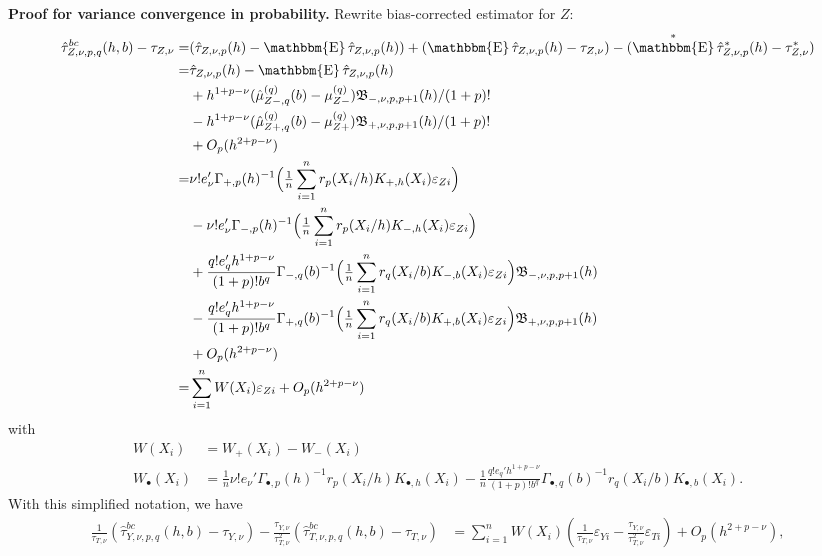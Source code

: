 \documentclass[12pt,]{article}
\DeclareMathOperator{\1}{\mathbbm{1}}
\DeclareMathOperator{\E}{\mathbbm{E}}
\newcommand{\Bf}{\mathfrak{B}}
\begin{document}
\textbf{Proof for variance convergence in probability.} Rewrite bias-corrected estimator for $Z$:
\begin{align*}
	\hat\tau_{Z, \nu, p, q}^{bc} (h, b) - \tau_{Z, \nu}
	=& (\hat\tau_{Z, \nu, p}(h) - \E \hat \tau_{Z, \nu, p}(h)) +
	(\E \hat \tau_{Z, \nu, p}(h) - \tau_{Z, \nu}) - (\E^{*} \hat \tau_{Z, \nu, p}^{*}(h) - \tau_{Z, \nu}^{*}) \\
	=& \hat\tau_{Z, \nu, p}(h) - \E \hat \tau_{Z, \nu, p}(h) \\
	 & + h^{1 + p - \nu} (\hat\mu_{Z-,q}^{(q)}(b) - \mu_{Z-}^{(q)}) \Bf_{-, \nu, p, p + 1}(h) /(1 + p)! \\
	 & - h^{1 + p - \nu} (\hat\mu_{Z+,q}^{(q)}(b) - \mu_{Z+}^{(q)}) \Bf_{+, \nu, p, p + 1}(h) /(1 + p)! \\
	 & + O_p(h^{2 + p - \nu}) \\
	=& \nu! e_\nu' \Gamma_{+,p}(h)^{-1} \Big(\tfrac{1}{n} \sum_{i=1}^n r_p(X_i/h) K_{+,h}(X_i) \varepsilon_{Zi}\Big) \\
	 & - \nu! e_\nu' \Gamma_{-,p}(h)^{-1} \Big(\tfrac{1}{n} \sum_{i=1}^n r_p(X_i/h) K_{-,h}(X_i) \varepsilon_{Zi}\Big) \\
	 & + \frac{q! e_q' h^{1 + p - \nu}}{(1 + p)! b^q} \Gamma_{-,q}(b)^{-1}
	\Big(\tfrac{1}{n} \sum_{i=1}^n r_q(X_i/b) K_{-,b}(X_i) \varepsilon_{Zi} \Big) \Bf_{-, \nu, p, p + 1}(h) \\
	 & - \frac{q! e_q' h^{1 + p - \nu}}{(1 + p)! b^q} \Gamma_{+,q}(b)^{-1}
	\Big(\tfrac{1}{n} \sum_{i=1}^n r_q(X_i/b) K_{+,b}(X_i) \varepsilon_{Zi} \Big) \Bf_{+, \nu, p, p + 1}(h) \\
	& + O_p(h^{2 + p - \nu}) \\
	=& \sum_{i = 1}^{n} W(X_i) \varepsilon_{Zi} + O_p(h^{2 + p - \nu})
\end{align*}
with
\begin{align*}
	W(X_i) & = W_+(X_i) - W_-(X_i) \\  
	W_\bullet(X_i) & = \tfrac{1}{n} \nu! e_\nu' \Gamma_{\bullet,p}(h)^{-1} r_p(X_i/h) K_{\bullet,h}(X_i) 
	- \tfrac{1}{n} \frac{q! e_q' h^{1 + p - \nu}}{(1 + p)! b^q} \Gamma_{\bullet,q}(b)^{-1} r_q(X_i/b) K_{\bullet,b}(X_i).
\end{align*}
With this simplified notation, we have
\begin{align*}
	\frac{1}{\tau_{T, \nu}} (\hat\tau_{Y, \nu, p, q}^{bc} (h, b) - \tau_{Y, \nu}) - 
	\frac{\tau_{Y, \nu}}{\tau_{T, \nu}^2} (\hat\tau_{T, \nu, p, q}^{bc} (h, b) - \tau_{T, \nu})
	& = \sum_{i = 1}^{n} W(X_i) (\frac{1}{\tau_{T, \nu}} \varepsilon_{Yi} - \frac{\tau_{Y, \nu}}{\tau_{T, \nu}^2} \varepsilon_{Ti}) + O_p(h^{2 + p - \nu}),
\end{align*}
\end{document}
